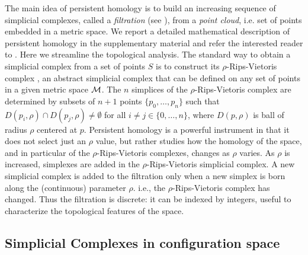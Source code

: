 \documentclass[preprintnumbers,showpacs, showkeys, twocolumn,secnumarabic,amssymb,amsmath,amsfonts,aps, pre]{revtex4-1}
\begin{document}
The main idea of persistent homology is to build  an increasing sequence of simplicial complexes, called a {\it filtration} (see \cite{Pers}), from a \textit{point cloud}, i.e. set of points embedded in a metric space. 
We report a detailed mathematical description of persistent homology in the supplementary material and refer the interested reader to \cite{Pers}. 
Here we streamline  the topological analysis.
The standard way to obtain a simplicial complex from a set of points $S$ is to construct its  $\rho$-Rips-Vietoris complex \cite{Pers}, an abstract simplicial complex that can be defined on any set of points in a given metric space ${\cal M}$. 
The $n$ simplices of the $\rho$-Rips-Vietoris complex are determined  by subsets of $n+1$ points $\lbrace p_0,\ldots, p_n \rbrace$ such that $D(p_i,\rho)\cap D(p_j,\rho)\ne \emptyset$ for all $ i\ne j \in \lbrace 0, \ldots, n\rbrace$, where $D(p,\rho)$ is ball of radius $\rho$  centered at $p$.
Persistent homology is a powerful instrument in that it does not 
select just an $\rho$ value, but rather studies how the homology of the space, and in particular of the $\rho$-Rips-Vietoris complexes, changes as $\rho$ varies.
As $\rho$ is increased, simplexes are added in the $\rho$-Rips-Vietoris simplicial complex.
A new simplicial complex is added to the filtration only when a new simplex is born along the (continuous) parameter $\rho$. 
i.e., the $\rho$-Rips-Vietoris complex has changed.
Thus the filtration  is discrete: it can be indexed by integers, useful to characterize the topological features of the space.

\subsection{Simplicial Complexes in configuration space}
\end{document}
